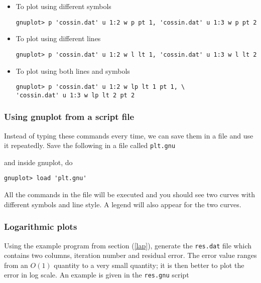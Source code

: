 \documentclass[11pt,oneside]{amsart}
\begin{document}
\begin{itemize}

\item To plot using different symbols
\begin{verbatim}
gnuplot> p 'cossin.dat' u 1:2 w p pt 1, 'cossin.dat' u 1:3 w p pt 2
\end{verbatim}

\item To plot using different lines
\begin{verbatim}
gnuplot> p 'cossin.dat' u 1:2 w l lt 1, 'cossin.dat' u 1:3 w l lt 2
\end{verbatim}

\item To plot using both lines and symbols
\begin{verbatim}
gnuplot> p 'cossin.dat' u 1:2 w lp lt 1 pt 1, \
'cossin.dat' u 1:3 w lp lt 2 pt 2
\end{verbatim}

\end{itemize}

\subsubsection{Using gnuplot from a script file}
Instead of typing these commands every time, we can save them in a file and use it repeatedly. Save the following in a file called {\tt plt.gnu}

and inside gnuplot, do
\begin{verbatim}
gnuplot> load 'plt.gnu'
\end{verbatim}
All the commands in the file will be executed and you should see two curves with different symbols and line style. A legend will also appear for the two curves.

\subsubsection{Logarithmic plots}
Using the example program from section (\ref{lap}), generate the {\tt res.dat} file which contains two columns, iteration number and residual error. The error value ranges from an $O(1)$ quantity to a very small quantity; it is then better to plot the error in log scale. An example is given in the {\tt res.gnu} script

\end{document}
